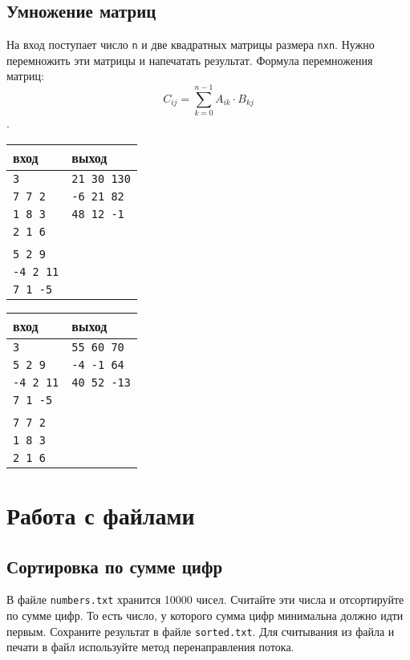 \documentclass{article}
\begin{document}
\subsection{Умножение матриц}
На вход поступает число \texttt{n} и две квадратных матрицы размера \texttt{nxn}. Нужно перемножить эти матрицы и напечатать результат. Формула перемножения матриц:
$$
C_{ij} = \sum\limits_{k=0}^{n-1} A_{ik} \cdot B_{kj}
$$.
\begin{multicols}{2}
\begin{center}
\begin{tabular}{ l | l }
 вход & выход \\ \hline
 \texttt{3} &     \texttt{21 30 130}  \\ 
 \texttt{7 7 2} & \texttt{-6 21 82}  \\
 \texttt{1 8 3} & \texttt{48 12 -1}  \\ 
 \texttt{2 1 6} &  \\ 
 \texttt{} &  \\
 \texttt{5 2 9} &  \\
 \texttt{-4 2 11} &  \\ 
 \texttt{7 1 -5} &  \\ 
\end{tabular}
\end{center}

\begin{center}
\begin{tabular}{ l | l }
 вход & выход \\ \hline
 \texttt{3} &     \texttt{55 60 70}  \\ 
 \texttt{5 2 9} & \texttt{-4 -1 64}  \\
 \texttt{-4 2 11} & \texttt{40 52 -13}  \\ 
 \texttt{7 1 -5} &  \\ 
 \texttt{} &  \\
 \texttt{7 7 2} &  \\
 \texttt{1 8 3} &  \\ 
 \texttt{2 1 6} &  \\ 
\end{tabular}
\end{center}
\end{multicols}
 
 
\newpage 
\section*{Работа с файлами} 
\subsection{Сортировка по сумме цифр}
В файле \texttt{numbers.txt} хранится 10000 чисел. Считайте эти числа и отсортируйте по сумме цифр. То есть число, у которого сумма цифр минимальна должно идти первым. Сохраните результат в файле \texttt{sorted.txt}. Для считывания из файла и печати в файл используйте метод перенаправления потока.
\end{document}
